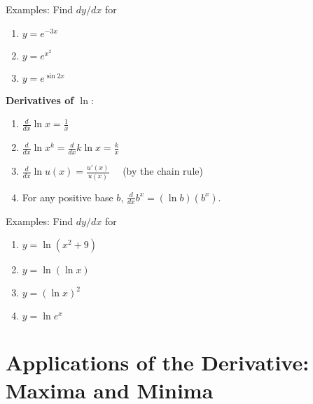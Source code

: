 \documentclass[]{book}
\theoremstyle{definition}
\theoremstyle{definition}
\theoremstyle{definition}
\theoremstyle{remark}
\begin{document}
Examples: Find \(dy/dx\) for

\begin{enumerate}
        \item \parbox[t]{1.5in}{$y=e^{-3x}$}\parbox[t]{4in}{} 
        \item \parbox[t]{1.5in}{$y=e^{x^2}$}\parbox[t]{4in}{} 
        \item \parbox[t]{1.5in}{$y=e^{\sin 2x}$}\parbox[t]{4in}{} 
\end{enumerate}

\textbf{Derivatives of $\ln$}:

\begin{enumerate}
        \item $\frac{d}{dx} \ln x = \frac{1}{x}$
        \item $\frac{d}{dx} \ln x^k = \frac{d}{dx} k \ln x = \frac{k}{x}$
        \item $\frac{d}{dx} \ln u(x) = \frac{u'(x)}{u(x)}\quad$  (by the chain rule)
        \item For any positive base $b$, $\frac{d}{dx} b^x = (\ln b)\left(b^x\right)$.
\end{enumerate}

Examples: Find \(dy/dx\) for

\begin{enumerate}
        \item \parbox[t]{1.5in}{$y=\ln(x^2+9)$}\parbox[t]{4in}{\phantom{Let $u(x)=x^2+9$.  Then $u'(x)=2x$ and $dy/dx=u'(x)/u(x)=2x/(x^2+9)$.}} 
        \item \parbox[t]{1.5in}{$y=\ln(\ln x)$}\parbox[t]{4in}{\phantom{Let $u(x)=\ln x$.  Then $u'(x)=1/x$ and $dy/dx=1/(x\ln x)$.}} 
        \item \parbox[t]{1.5in}{$y=(\ln x)^2$}\parbox[t]{4in}{\phantom{Use the generalized power rule. $dy/dx=(2\ln x)/x$.}} 
        \item \parbox[t]{1.5in}{$y=\ln e^x$}\parbox[t]{4in}{\phantom{(We know that $\ln e^x=x$ and that $dx/dx=1$, but let's double check.)  Let $u(x)=e^x$.  Then $u'(x)=e^x$ and $dy/dx=u'(x)/u(x)=e^x/e^x=1$.}} 
\end{enumerate}

\section{Applications of the Derivative: Maxima and
Minima}\label{applications-of-the-derivative-maxima-and-minima}
\end{document}
